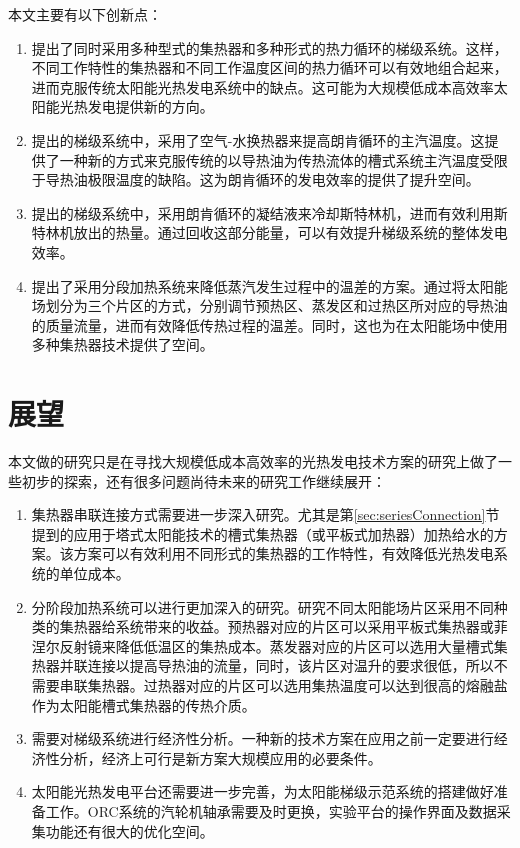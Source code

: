 本文主要有以下创新点：
\begin{enumerate}[label=(\arabic*)]
  \item 提出了同时采用多种型式的集热器和多种形式的热力循环的梯级系统。这样，不同工作特性的集热器和不同工作温度区间的热力循环可以有效地组合起来，进而克服传统太阳能光热发电系统中的缺点。这可能为大规模低成本高效率太阳能光热发电提供新的方向。
  \item 提出的梯级系统中，采用了空气-水换热器来提高朗肯循环的主汽温度。这提供了一种新的方式来克服传统的以导热油为传热流体的槽式系统主汽温度受限于导热油极限温度的缺陷。这为朗肯循环的发电效率的提供了提升空间。
  \item 提出的梯级系统中，采用朗肯循环的凝结液来冷却斯特林机，进而有效利用斯特林机放出的热量。通过回收这部分能量，可以有效提升梯级系统的整体发电效率。
  \item 提出了采用分段加热系统来降低蒸汽发生过程中的温差的方案。通过将太阳能场划分为三个片区的方式，分别调节预热区、蒸发区和过热区所对应的导热油的质量流量，进而有效降低传热过程的温差。同时，这也为在太阳能场中使用多种集热器技术提供了空间。
\end{enumerate}

\section{展望}
本文做的研究只是在寻找大规模低成本高效率的光热发电技术方案的研究上做了一些初步的探索，还有很多问题尚待未来的研究工作继续展开：
\begin{enumerate}[label=(\arabic*)]
  \item 集热器串联连接方式需要进一步深入研究。尤其是第\ref{sec:seriesConnection}节提到的应用于塔式太阳能技术的槽式集热器（或平板式加热器）加热给水的方案。该方案可以有效利用不同形式的集热器的工作特性，有效降低光热发电系统的单位成本。
  \item 分阶段加热系统可以进行更加深入的研究。研究不同太阳能场片区采用不同种类的集热器给系统带来的收益。预热器对应的片区可以采用平板式集热器或菲涅尔反射镜来降低低温区的集热成本。蒸发器对应的片区可以选用大量槽式集热器并联连接以提高导热油的流量，同时，该片区对温升的要求很低，所以不需要串联集热器。过热器对应的片区可以选用集热温度可以达到很高的熔融盐作为太阳能槽式集热器的传热介质。
  \item 需要对梯级系统进行经济性分析。一种新的技术方案在应用之前一定要进行经济性分析，经济上可行是新方案大规模应用的必要条件。
  \item 太阳能光热发电平台还需要进一步完善，为太阳能梯级示范系统的搭建做好准备工作。ORC系统的汽轮机轴承需要及时更换，实验平台的操作界面及数据采集功能还有很大的优化空间。
\end{enumerate}